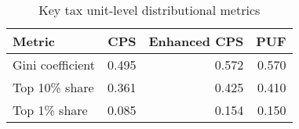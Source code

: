 \begin{table}[h]
    \centering
    \caption{Key tax unit-level distributional metrics}
    \label{tab:tax_unit_metrics}
    \begin{tabular}{lrrr}
    \toprule
    Metric & CPS & Enhanced CPS & PUF \\
    \midrule
    Gini coefficient & 0.495 & 0.572 & 0.570 \\
    Top 10\% share & 0.361 & 0.425 & 0.410 \\
    Top 1\% share & 0.085 & 0.154 & 0.150 \\
    \bottomrule
    \end{tabular}
\end{table}

